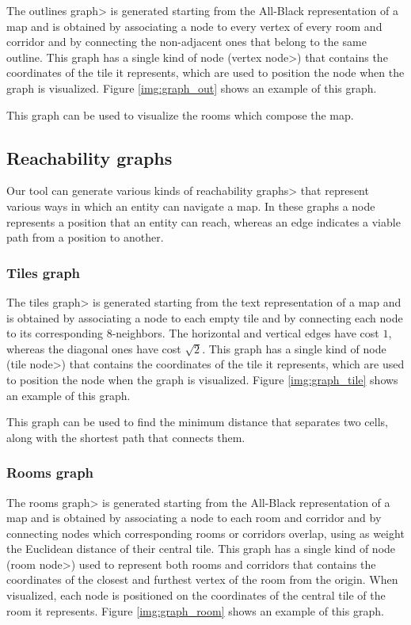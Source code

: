 The \<outlines graph> is generated starting from the All-Black representation of a map and is obtained by associating a node to every vertex of every room and corridor and by connecting the non-adjacent ones that belong to the same outline. This graph has a single kind of node (\<vertex node>) that contains the coordinates of the tile it represents, which are used to position the node when the graph is visualized. Figure \ref{img:graph_out} shows an example of this graph.

\par

This graph can be used to visualize the rooms which compose the map.

\subsection{Reachability graphs}

Our tool can generate various kinds of \<reachability graphs> that represent various ways in which an entity can navigate a map. In these graphs a node represents a position that an entity can reach, whereas an edge indicates a viable path from a position to another.

\subsubsection{Tiles graph}

The \<tiles graph> is generated starting from the text representation of a map and is obtained by associating a node to each empty tile and by connecting each node to its corresponding 8-neighbors. The horizontal and vertical edges have cost $1$, whereas the diagonal ones have cost $\sqrt{2}$. This graph has a single kind of node (\<tile node>) that contains the coordinates of the tile it represents, which are used to position the node when the graph is visualized. Figure \ref{img:graph_tile} shows an example of this graph.

\par

This graph can be used to find the minimum distance that separates two cells, along with the shortest path that connects them.

\subsubsection{Rooms graph}

The \<rooms graph> is generated starting from the All-Black representation of a map and is obtained by associating a node to each room and corridor and by connecting nodes which corresponding rooms or corridors overlap, using as weight the Euclidean distance of their central tile. This graph has a single kind of node (\<room node>) used to represent both rooms and corridors that contains the coordinates of the closest and furthest vertex of the room from the origin. When visualized, each node is positioned on the coordinates of the central tile of the room it represents. Figure \ref{img:graph_room} shows an example of this graph.

